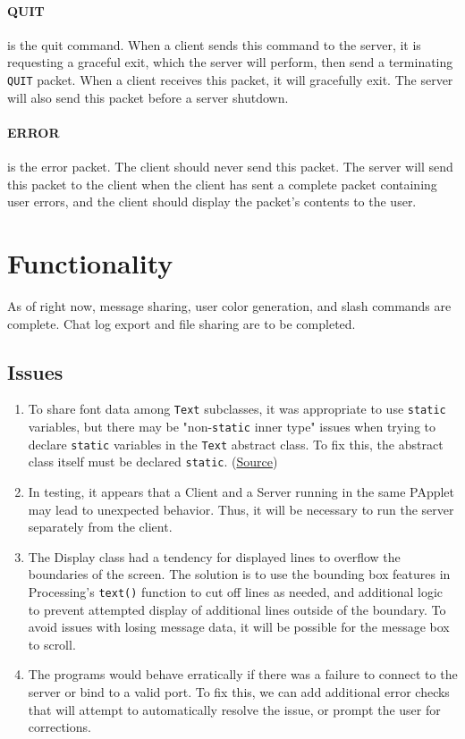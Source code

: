 \documentclass{article}
\begin{document}
\paragraph{QUIT} is the quit command. When a client sends this command to the server, it is requesting a graceful exit, which the server will perform, then send a terminating \verb|QUIT| packet. When a client receives this packet, it will gracefully exit. The server will also send this packet before a server shutdown.

\paragraph{ERROR} is the error packet. The client should never send this packet. The server will send this packet to the client when the client has sent a complete packet containing user errors, and the client should display the packet's contents to the user.

\section{Functionality}
As of right now, message sharing, user color generation, and slash commands are complete. Chat log export and file sharing are to be completed.

\subsection{Issues}
\begin{enumerate}
    \item To share font data among \verb|Text| subclasses, it was appropriate to use \verb|static| variables, but there may be "non-\verb|static| inner type" issues when trying to declare \verb|static| variables in the \verb|Text| abstract class. To fix this, the abstract class itself must be declared \verb|static|. (\href{https://forum.processing.org/two/discussion/23623/when-creating-a-class-what-is-it-an-inner-class-of-declared-static-in-a-non-static-inner-type.html}{Source})
    \item In testing, it appears that a Client and a Server running in the same PApplet may lead to unexpected behavior. Thus, it will be necessary to run the server separately from the client.
    \item The Display class had a tendency for displayed lines to overflow the boundaries of the screen. The solution is to use the bounding box features in Processing's \verb|text()| function to cut off lines as needed, and additional logic to prevent attempted display of additional lines outside of the boundary. To avoid issues with losing message data, it will be possible for the message box to scroll.
    \item The programs would behave erratically if there was a failure to connect to the server or bind to a valid port. To fix this, we can add additional error checks that will attempt to automatically resolve the issue, or prompt the user for corrections.
\end{enumerate}
\end{document}
